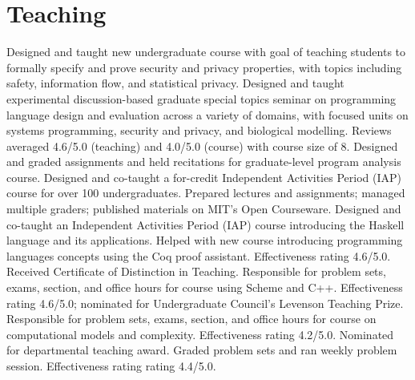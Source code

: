 \section{Teaching}
  {}{Designed and taught new undergraduate course with goal of teaching students to formally specify and prove security and privacy properties, with topics including safety, information flow, and statistical privacy.}
  {}{Designed and taught experimental discussion-based graduate special topics seminar on programming language design and evaluation across a variety of domains, with focused units on systems programming, security and privacy, and biological modelling. Reviews averaged 4.6/5.0 (teaching) and 4.0/5.0 (course) with course size of 8.}
  {}{Designed and graded assignments and held recitations for graduate-level program analysis course.}
  {}{Designed and co-taught a for-credit Independent Activities Period (IAP) course for over 100 undergraduates.  Prepared lectures and assignments; managed multiple graders; published materials on MIT's Open Courseware.}
  {}{Designed and co-taught an Independent Activities Period (IAP) course introducing the Haskell language and its applications.}
  {}{Helped with new course introducing programming languages concepts using the Coq proof assistant.  Effectiveness rating 4.6/5.0.  Received Certificate of Distinction in Teaching.}
  {Responsible for problem sets, exams, section, and office hours for course using Scheme and C++.  Effectiveness rating 4.6/5.0; nominated for Undergraduate Council's Levenson Teaching Prize.}
  {Responsible for problem sets, exams, section, and office hours for course on computational models and complexity.  Effectiveness rating 4.2/5.0.  Nominated for departmental teaching award.}
  {Graded problem sets and ran weekly problem session.  Effectiveness rating rating 4.4/5.0.}
